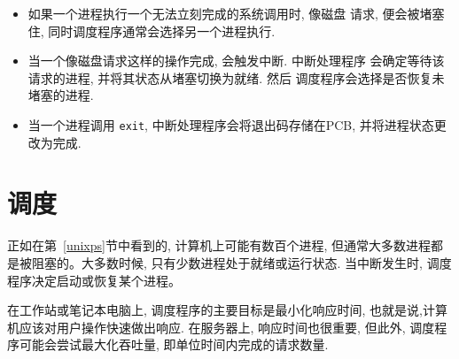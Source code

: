 \documentclass[12pt]{book}
\begin{document}
{\begin{itemize}
\item 如果一个进程执行一个无法立刻完成的系统调用时, 像磁盘
请求, 便会被堵塞住, 同时调度程序通常会选择另一个进程执行. 

\item 当一个像磁盘请求这样的操作完成, 会触发中断. 中断处理程序
会确定等待该请求的进程, 并将其状态从堵塞切换为就绪. 然后
调度程序会选择是否恢复未堵塞的进程. 

\item 当一个进程调用 {\tt exit}, 中断处理程序会将退出码存储在PCB, 
并将进程状态更改为完成. 

\end{itemize}


\section{调度}

正如在第~\ref{unixps}节中看到的, 计算机上可能有数百个进程, 但通常大多数进程都是被阻塞的。大多数时候, 只有少数进程处于就绪或运行状态. 当中断发生时, 调度程序决定启动或恢复某个进程。

在工作站或笔记本电脑上, 调度程序的主要目标是最小化响应时间, 也就是说,计算机应该对用户操作快速做出响应. 在服务器上, 响应时间也很重要, 但此外, 调度程序可能会尝试最大化吞吐量, 即单位时间内完成的请求数量.

}
\end{document}
